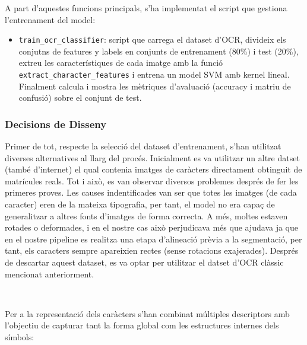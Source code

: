 A part d'aquestes funcions principals, s'ha implementat el script que gestiona l'entrenament del model:

\begin{itemize}
    \item \texttt{train\_ocr\_classifier}: script que carrega el dataset d'OCR, divideix els conjutns de features y labels en conjunts de entrenament (80\%) i test (20\%), extreu les característiques de cada imatge amb la funció \texttt{extract\_character\_features}  i entrena un model SVM amb kernel lineal. Finalment calcula i mostra les mètriques d'avaluació (accuracy i matriu de confusió) sobre el conjunt de test.
\end{itemize}

\subsubsection{Decisions de Disseny}

Primer de tot, respecte la selecció del dataset d'entrenament, s'han utilitzat diverses alternatives al llarg del procés. Inicialment es va utilitzar un altre datset (també d'internet) el qual contenia imatges de caràcters directament obtinguit de matrícules reals. Tot i això, es van observar diversos problemes després de fer les primeres proves. Les causes indentificades van ser que totes les imatges (de cada caracter) eren de la mateixa tipografia, per tant, el model no era capaç de generalitzar a altres fonts d'imatges de forma correcta. A més, moltes estaven rotades o deformades, i en el nostre cas això perjudicava més que ajudava ja que en el nostre pipeline es realitza una etapa d'alineació prèvia a la segmentació, per tant, els caracters sempre apareixien rectes (sense rotacions exajerades). Després de descartar aquest dataset, es va optar per utilitzar el datset d'OCR clàssic mencionat anteriorment. 

\

Per a la representació dels caràcters s'han combinat múltiples descriptors amb l'objectiu de capturar tant la forma global com les estructures internes dels símbols:

